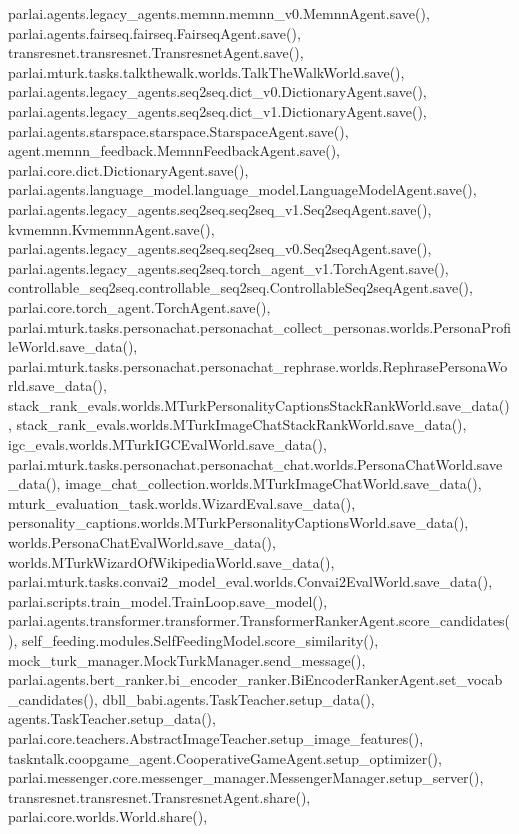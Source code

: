 parlai.\+agents.\+legacy\+\_\+agents.\+memnn.\+memnn\+\_\+v0.\+Memnn\+Agent.\+save(), parlai.\+agents.\+fairseq.\+fairseq.\+Fairseq\+Agent.\+save(), transresnet.\+transresnet.\+Transresnet\+Agent.\+save(), parlai.\+mturk.\+tasks.\+talkthewalk.\+worlds.\+Talk\+The\+Walk\+World.\+save(), parlai.\+agents.\+legacy\+\_\+agents.\+seq2seq.\+dict\+\_\+v0.\+Dictionary\+Agent.\+save(), parlai.\+agents.\+legacy\+\_\+agents.\+seq2seq.\+dict\+\_\+v1.\+Dictionary\+Agent.\+save(), parlai.\+agents.\+starspace.\+starspace.\+Starspace\+Agent.\+save(), agent.\+memnn\+\_\+feedback.\+Memnn\+Feedback\+Agent.\+save(), parlai.\+core.\+dict.\+Dictionary\+Agent.\+save(), parlai.\+agents.\+language\+\_\+model.\+language\+\_\+model.\+Language\+Model\+Agent.\+save(), parlai.\+agents.\+legacy\+\_\+agents.\+seq2seq.\+seq2seq\+\_\+v1.\+Seq2seq\+Agent.\+save(), kvmemnn.\+Kvmemnn\+Agent.\+save(), parlai.\+agents.\+legacy\+\_\+agents.\+seq2seq.\+seq2seq\+\_\+v0.\+Seq2seq\+Agent.\+save(), parlai.\+agents.\+legacy\+\_\+agents.\+seq2seq.\+torch\+\_\+agent\+\_\+v1.\+Torch\+Agent.\+save(), controllable\+\_\+seq2seq.\+controllable\+\_\+seq2seq.\+Controllable\+Seq2seq\+Agent.\+save(), parlai.\+core.\+torch\+\_\+agent.\+Torch\+Agent.\+save(), parlai.\+mturk.\+tasks.\+personachat.\+personachat\+\_\+collect\+\_\+personas.\+worlds.\+Persona\+Profile\+World.\+save\+\_\+data(), parlai.\+mturk.\+tasks.\+personachat.\+personachat\+\_\+rephrase.\+worlds.\+Rephrase\+Persona\+World.\+save\+\_\+data(), stack\+\_\+rank\+\_\+evals.\+worlds.\+M\+Turk\+Personality\+Captions\+Stack\+Rank\+World.\+save\+\_\+data(), stack\+\_\+rank\+\_\+evals.\+worlds.\+M\+Turk\+Image\+Chat\+Stack\+Rank\+World.\+save\+\_\+data(), igc\+\_\+evals.\+worlds.\+M\+Turk\+I\+G\+C\+Eval\+World.\+save\+\_\+data(), parlai.\+mturk.\+tasks.\+personachat.\+personachat\+\_\+chat.\+worlds.\+Persona\+Chat\+World.\+save\+\_\+data(), image\+\_\+chat\+\_\+collection.\+worlds.\+M\+Turk\+Image\+Chat\+World.\+save\+\_\+data(), mturk\+\_\+evaluation\+\_\+task.\+worlds.\+Wizard\+Eval.\+save\+\_\+data(), personality\+\_\+captions.\+worlds.\+M\+Turk\+Personality\+Captions\+World.\+save\+\_\+data(), worlds.\+Persona\+Chat\+Eval\+World.\+save\+\_\+data(), worlds.\+M\+Turk\+Wizard\+Of\+Wikipedia\+World.\+save\+\_\+data(), parlai.\+mturk.\+tasks.\+convai2\+\_\+model\+\_\+eval.\+worlds.\+Convai2\+Eval\+World.\+save\+\_\+data(), parlai.\+scripts.\+train\+\_\+model.\+Train\+Loop.\+save\+\_\+model(), parlai.\+agents.\+transformer.\+transformer.\+Transformer\+Ranker\+Agent.\+score\+\_\+candidates(), self\+\_\+feeding.\+modules.\+Self\+Feeding\+Model.\+score\+\_\+similarity(), mock\+\_\+turk\+\_\+manager.\+Mock\+Turk\+Manager.\+send\+\_\+message(), parlai.\+agents.\+bert\+\_\+ranker.\+bi\+\_\+encoder\+\_\+ranker.\+Bi\+Encoder\+Ranker\+Agent.\+set\+\_\+vocab\+\_\+candidates(), dbll\+\_\+babi.\+agents.\+Task\+Teacher.\+setup\+\_\+data(), agents.\+Task\+Teacher.\+setup\+\_\+data(), parlai.\+core.\+teachers.\+Abstract\+Image\+Teacher.\+setup\+\_\+image\+\_\+features(), taskntalk.\+coopgame\+\_\+agent.\+Cooperative\+Game\+Agent.\+setup\+\_\+optimizer(), parlai.\+messenger.\+core.\+messenger\+\_\+manager.\+Messenger\+Manager.\+setup\+\_\+server(), transresnet.\+transresnet.\+Transresnet\+Agent.\+share(), parlai.\+core.\+worlds.\+World.\+share(), 
